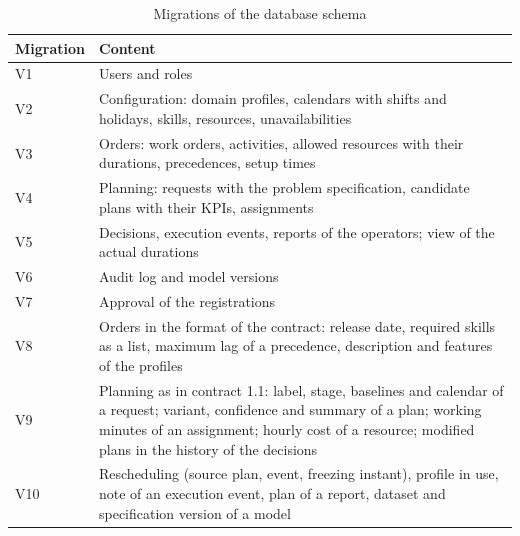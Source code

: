\begin{table}[htpb]
  \centering
  \small
  \begin{tabular}{@{}lp{11.6cm}@{}}
    \toprule
    \textbf{Migration} & \textbf{Content} \\
    \midrule
    V1 & Users and roles \\
    V2 & Configuration: domain profiles, calendars with shifts and holidays, skills, resources,
         unavailabilities \\
    V3 & Orders: work orders, activities, allowed resources with their durations, precedences,
         setup times \\
    V4 & Planning: requests with the problem specification, candidate plans with their KPIs,
         assignments \\
    V5 & Decisions, execution events, reports of the operators; view of the actual durations \\
    V6 & Audit log and model versions \\
    V7 & Approval of the registrations \\
    V8 & Orders in the format of the contract: release date, required skills as a list, maximum
         lag of a precedence, description and features of the profiles \\
    V9 & Planning as in contract 1.1: label, stage, baselines and calendar of a request; variant,
         confidence and summary of a plan; working minutes of an assignment; hourly cost of a
         resource; modified plans in the history of the decisions \\
    V10 & Rescheduling (source plan, event, freezing instant), profile in use, note of an
          execution event, plan of a report, dataset and specification version of a model \\
    \bottomrule
  \end{tabular}
  \caption{Migrations of the database schema}
  \label{tab:migrations}
\end{table}

